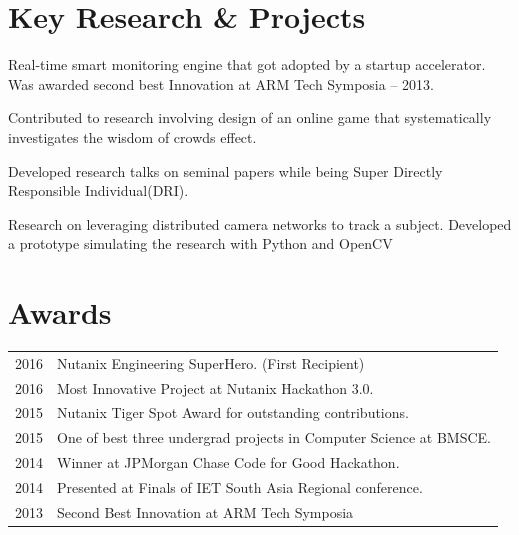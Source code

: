 \documentclass[]{deedy-resume-openfont}
\begin{document}
\begin{minipage}[t]{0.66\textwidth}
	\section{Key Research \& Projects}
	Real-time smart monitoring engine that got adopted by a startup accelerator. Was awarded second best Innovation at ARM Tech Symposia – 2013.
	\sectionsep
	    
	Contributed to research involving design of an online game that systematically investigates the wisdom of crowds effect.
	\sectionsep
	    
	Developed research talks on seminal papers while being Super Directly Responsible Individual(DRI).
	\sectionsep
	    
	Research on leveraging distributed camera networks to track a subject. Developed a prototype simulating the research with Python and OpenCV
	\sectionsep
	    
	
	\section{Awards} 
	\begin{tabular}{ll}
		2016 & Nutanix Engineering SuperHero. (First Recipient)                   \\
		2016 & Most Innovative Project at Nutanix Hackathon 3.0.                  \\
		2015 & Nutanix Tiger Spot Award for outstanding contributions.            \\
		2015 & One of best three undergrad projects in Computer Science at BMSCE. \\
		2014 & Winner at JPMorgan Chase Code for Good Hackathon.                  \\
		2014 & Presented at Finals of IET South Asia Regional conference.         \\
		2013 & Second Best Innovation at ARM Tech Symposia                        
	\end{tabular}
	\sectionsep
	
	    
\end{minipage} 
\end{document}
